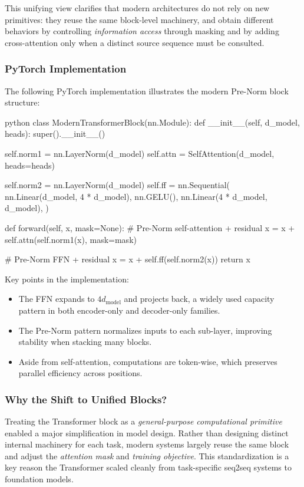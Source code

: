 \noindent
This unifying view clarifies that modern architectures do not rely on new primitives:
they reuse the same block-level machinery,
and obtain different behaviors by controlling \emph{information access} through masking
and by adding cross-attention only when a distinct source sequence must be consulted.

\newpage

\subsubsection{PyTorch Implementation}
\noindent
The following PyTorch implementation illustrates the modern Pre-Norm block structure:

\begin{mintedbox}{python}
	class ModernTransformerBlock(nn.Module):
	def __init__(self, d_model, heads):
	super().__init__()
	
	self.norm1 = nn.LayerNorm(d_model)
	self.attn = SelfAttention(d_model, heads=heads)
	
	self.norm2 = nn.LayerNorm(d_model)
	self.ff = nn.Sequential(
	nn.Linear(d_model, 4 * d_model),
	nn.GELU(),
	nn.Linear(4 * d_model, d_model),
	)
	
	def forward(self, x, mask=None):
	# Pre-Norm self-attention + residual
	x = x + self.attn(self.norm1(x), mask=mask)
	
	# Pre-Norm FFN + residual
	x = x + self.ff(self.norm2(x))
	return x
\end{mintedbox}

\noindent
Key points in the implementation:
\begin{itemize}
	\item The FFN expands to \(4d_{\text{model}}\) and projects back,
	a widely used capacity pattern in both encoder-only and decoder-only families.
	\item The Pre-Norm pattern normalizes inputs to each sub-layer,
	improving stability when stacking many blocks.
	\item Aside from self-attention, computations are token-wise,
	which preserves parallel efficiency across positions.
\end{itemize}

\subsubsection{Why the Shift to Unified Blocks?}
\noindent
Treating the Transformer block as a \emph{general-purpose computational primitive}
enabled a major simplification in model design.
Rather than designing distinct internal machinery for each task,
modern systems largely reuse the same block
and adjust the \emph{attention mask} and \emph{training objective}.
This standardization is a key reason the Transformer scaled cleanly
from task-specific seq2seq systems to foundation models.

